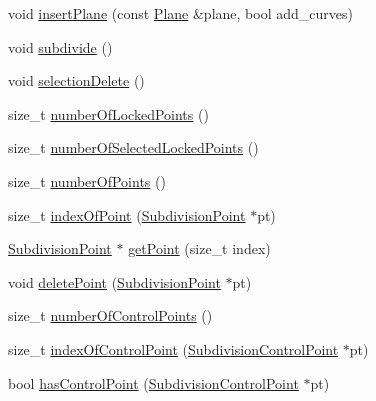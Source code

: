 \begin{DoxyCompactItemize}
\item 
void \hyperlink{classShipCADGeometry_1_1SubdivisionSurface_ada26b740ea1f317763b6ecd372f13ea2}{insert\-Plane} (const \hyperlink{classShipCADGeometry_1_1Plane}{Plane} \&plane, bool add\-\_\-curves)
\item 
void \hyperlink{classShipCADGeometry_1_1SubdivisionSurface_ad9970c667fa8e33ff8b35eb6a48b6a2e}{subdivide} ()
\item 
void \hyperlink{classShipCADGeometry_1_1SubdivisionSurface_a99bda5b49300775eda1df60451412686}{selection\-Delete} ()
\item 
size\-\_\-t \hyperlink{classShipCADGeometry_1_1SubdivisionSurface_a771f0f1881a2da57dde8cb88a8fc9059}{number\-Of\-Locked\-Points} ()
\item 
size\-\_\-t \hyperlink{classShipCADGeometry_1_1SubdivisionSurface_a2583bc0013b5725ac0902062d1c8bcea}{number\-Of\-Selected\-Locked\-Points} ()
\item 
size\-\_\-t \hyperlink{classShipCADGeometry_1_1SubdivisionSurface_a3778b3458f63987b5ef6dd482e6edc13}{number\-Of\-Points} ()
\item 
size\-\_\-t \hyperlink{classShipCADGeometry_1_1SubdivisionSurface_a1bde01d6b5972c302ad387cf1247f0fa}{index\-Of\-Point} (\hyperlink{classShipCADGeometry_1_1SubdivisionPoint}{Subdivision\-Point} $\ast$pt)
\item 
\hyperlink{classShipCADGeometry_1_1SubdivisionPoint}{Subdivision\-Point} $\ast$ \hyperlink{classShipCADGeometry_1_1SubdivisionSurface_af07192c8cfc3429ad6da80a1da802a6c}{get\-Point} (size\-\_\-t index)
\item 
void \hyperlink{classShipCADGeometry_1_1SubdivisionSurface_a4117039bfd819cb28ab5cb04296fdcd7}{delete\-Point} (\hyperlink{classShipCADGeometry_1_1SubdivisionPoint}{Subdivision\-Point} $\ast$pt)
\item 
size\-\_\-t \hyperlink{classShipCADGeometry_1_1SubdivisionSurface_ae965f02af93afdd0b164d39af6c38ce3}{number\-Of\-Control\-Points} ()
\item 
size\-\_\-t \hyperlink{classShipCADGeometry_1_1SubdivisionSurface_ae0dda53669e5767da6434b3e2f751916}{index\-Of\-Control\-Point} (\hyperlink{classShipCADGeometry_1_1SubdivisionControlPoint}{Subdivision\-Control\-Point} $\ast$pt)
\item 
bool \hyperlink{classShipCADGeometry_1_1SubdivisionSurface_a62abb29703f608a75559452d25db9a33}{has\-Control\-Point} (\hyperlink{classShipCADGeometry_1_1SubdivisionControlPoint}{Subdivision\-Control\-Point} $\ast$pt)
\item 

\end{DoxyCompactItemize}
